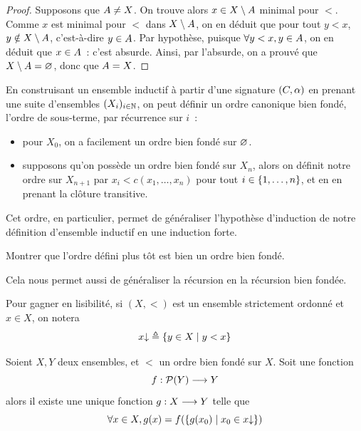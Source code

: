 \begin{proof}
  Supposons que $A\neq X$. On trouve alors $x\in X \setminus A$
  minimal pour $<$. Comme $x$ est minimal pour $<$ dans $X\setminus A$, on
  en déduit que pour tout $y < x$, $y \notin X\setminus A$, c'est-à-dire
  $y\in A$. Par hypothèse, puisque $\forall y < x, y\in A$, on en
  déduit que $x\in A$~: c'est absurde. Ainsi, par l'absurde, on a prouvé
  que $X\setminus A = \varnothing$, donc que $A = X$.
\end{proof}

\begin{remark}
  En construisant un ensemble inductif à partir d'une signature $(C,\alpha)$ en
  prenant une suite d'ensembles $(X_i)_{i\in \mathbb N}$, on peut définir un ordre
  canonique bien fondé, l'ordre de sous-terme, par récurrence sur $i$~:
  \begin{itemize}
  \item pour $X_0$, on a facilement un ordre bien fondé sur $\varnothing$.
  \item supposons qu'on possède un ordre bien fondé sur $X_n$, alors on définit
    notre ordre sur $X_{n+1}$ par $x_i < c(x_1,\ldots,x_n)$ pour tout
    $i \in \{1,\ldots,n\}$, et en en prenant la clôture transitive.
  \end{itemize}

  Cet ordre, en particulier, permet de généraliser l'hypothèse d'induction de
  notre définition d'ensemble inductif en une induction forte.
\end{remark}

\begin{exercise}
  Montrer que l'ordre défini plus tôt est bien un ordre bien fondé.
\end{exercise}

\noindent
Cela nous permet aussi de généraliser la récursion en la récursion bien fondée.

\begin{notation}
  Pour gagner en lisibilité, si $(X,<)$ est un ensemble strictement ordonné et
  $x \in X$, on notera
  \[x\mathbin{\downarrow} \triangleq \left\{ y \in X \;\middle\vert\; y < x \right\}\]
\end{notation}

\begin{theorem}\label{thm.recur.bf}
  Soient $X,Y$ deux ensembles, et $<$ un ordre bien fondé sur $X$. Soit
  une fonction
  \[f : \displaystyle \mathcal{P}(Y) \longrightarrow Y\]
  alors il existe une unique fonction $g : \displaystyle X \longrightarrow Y$ telle que
  \[\forall x \in X, g(x) = f(\left\{ g(x_0) \;\middle\vert\; x_0 \in x\mathbin{\downarrow} \right\})\]
\end{theorem}

